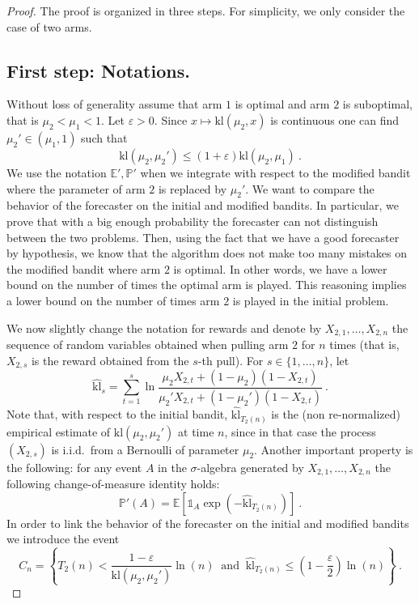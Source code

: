 \documentclass[11pt]{hackednow}
\newcommand{\kl}{\mathrm{kl}}
\renewcommand{\P}{\mathbb{P}}
\newcommand{\E}{\mathbb{E}}
\def\ds1{\mathds{1}}
\renewcommand{\epsilon}{\varepsilon}
\begin{document}
\begin{proof}
The proof is organized in three steps. For simplicity, we only consider the case of two arms.

\subsection*{First step: Notations.}
Without loss of generality assume that arm $1$ is optimal and arm $2$ is suboptimal, that is $\mu_2 < \mu_1 < 1$. Let $\epsilon > 0$. Since $x \mapsto \kl(\mu_2,x)$ is continuous one can find $\mu_2' \in (\mu_1,1)$ such that
\begin{equation} \label{eq:defmu2prime}
\kl(\mu_2,\mu_2') \leq (1+\epsilon) \kl(\mu_2,\mu_1)~.
\end{equation}
We use the notation $\E', \P'$ when we integrate with respect to the modified bandit where the parameter of arm $2$ is replaced by $\mu_2'$. We want to compare the behavior of the forecaster on the initial and modified bandits. In particular, we prove that with a big enough probability the forecaster can not distinguish between the two problems. Then, using the fact that we have a good forecaster by hypothesis, we know that the algorithm does not make too many mistakes on the modified bandit where arm $2$ is optimal. In other words, we have a lower bound on the number of times the optimal arm is played. This reasoning implies a lower bound on the number of times arm $2$ is played in the initial problem.

We now slightly change the notation for rewards and denote by $X_{2,1}, \hdots, X_{2,n}$ the sequence of random variables obtained when pulling arm $2$ for $n$ times (that is, $X_{2,s}$ is the reward obtained from the $s$-th pull).
For $s \in \{1, \hdots, n\}$, let
$$\widehat{\kl}_s=\sum_{t=1}^{s} \ln \frac{\mu_2 X_{2,t} + (1-\mu_2) (1-X_{2,t})}{\mu_2' X_{2,t} + (1-\mu_2') (1-X_{2,t})}~.$$
Note that, with respect to the initial bandit, $\widehat{\kl}_{T_2(n)}$ is the (non re-normalized) empirical estimate of $\kl(\mu_2, \mu_2')$ at time $n$, since in that case the process $(X_{2,s})$ is i.i.d.\ from a Bernoulli of parameter $\mu_2$. Another important property is the following: for any event $A$ in the $\sigma$-algebra generated by $X_{2,1},\dots,X_{2,n}$ the following change-of-measure identity holds:
\begin{equation} \label{eq:KLchapeauprop}
\P'(A) = \E \left[\ds1_{A} \exp\left(- \widehat{\kl}_{T_2(n)} \right)\right]~.
\end{equation}
%
In order to link the behavior of the forecaster on the initial and modified bandits we introduce the event
\begin{equation} \label{eq:cndef}
C_n = \left\{ T_2(n) < \frac{1-\epsilon}{\kl(\mu_2,\mu_2')} \ln(n) \;\; \text{and} \;\; \widehat{\kl}_{T_2(n)} \leq \left(1-\frac{\epsilon}{2}\right) \ln(n) \right\}~.
\end{equation}


\end{proof}
\end{document}
